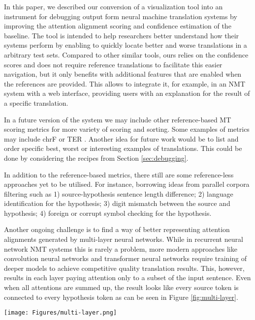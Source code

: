 \documentclass[runningheads,a4paper]{lncs/llncs}
\begin{document}
In this paper, we described our conversion of a visualization tool into an instrument for debugging output form neural machine translation systems by improving the attention alignment scoring and confidence estimation of the baseline. The tool is intended to help researchers better understand how their systems perform by enabling to quickly locate better and worse translations in a arbitrary test sets.
Compared to other similar tools, ours relies on the confidence scores and does not require reference translations to facilitate this easier navigation, but it only benefits with additional features that are enabled when the references are provided. This allows to integrate it, for example, in an NMT system with a web interface, providing users with an explanation for the result of a specific translation.

In a future version of the system we may include other reference-based MT scoring metrics for more variety of scoring and sorting. Some examples of metrics may include chrF \cite{popovic2015chrf} or TER \cite{snover2006study}. Another idea for future work would be to list and order specific best, worst or interesting examples of translations. This could be done by considering the recipes from Section \ref{sec:debugging}. 

In addition to the reference-based metrics, there still are some reference-less approaches yet to be utilised. For instance, borrowing ideas from parallel corpora filtering \cite{pinnis-EtAl:2017:WMT} such as 1) source-hypothesis sentence length difference; 2) language identification for the hypothesis; 3) digit mismatch between the source and hypothesis; 4) foreign or corrupt symbol checking for the hypothesis.

Another ongoing challenge is to find a way of better representing attention alignments generated by multi-layer neural networks. While in recurrent neural network NMT systems this is rarely a problem, more modern approaches like convolution neural networks \cite{gehring2017convolutional} and transformer neural networks \cite{VaswaniSPUJGKP17} require training of deeper models to achieve competitive quality translation results. This, however, results in each layer paying attention only to a subset of the input sentence. Even when all attentions are summed up, the result looks like every source token is connected to every hypothesis token as can be seen in Figure \ref{fig:multi-layer}.

\begin{figure*}[ht]
  \texttt{[image: Figures/multi-layer.png]}
  \caption{An example of attention alignments from a 15-layer encoder and 15-layer decoder convolutional neural machine translation system trained with FairSeq.}
  \label{fig:multi-layer}
\end{figure*}
\end{document}
